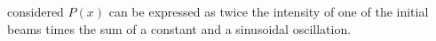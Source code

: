 \documentclass[aps, prl, twocolumn, groupedaddress]{revtex4-1}
\begin{document}
\begin{table}
{                                                                                                                                                                                                                                                                                                                                                                                                                                                                                                                                considered $P(x)$ can be expressed as twice the intensity of one of the initial beams
                                                                                                                                                                                                                                                                                                                                                                                                                                                                                                                                times the sum of a constant and a sinusoidal oscillation.} \label{tab:theory}
\end{table}

\end{document}
